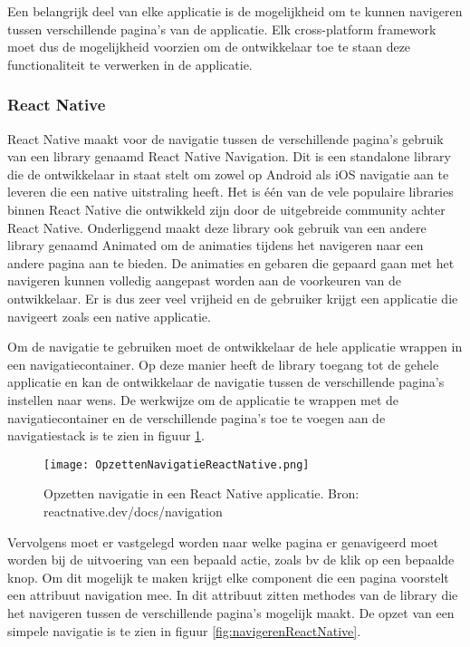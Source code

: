 Een belangrijk deel van elke applicatie is de mogelijkheid om te kunnen navigeren tussen verschillende pagina's van de applicatie. Elk cross-platform framework moet dus de mogelijkheid voorzien om de ontwikkelaar toe te staan deze functionaliteit te verwerken in de applicatie.

\subsubsection{React Native}
\label{subsubsec:navigatieReactNative}

React Native maakt voor de navigatie tussen de verschillende pagina's gebruik van een library genaamd React Native Navigation. Dit is een standalone library die de ontwikkelaar in staat stelt om zowel op Android als iOS navigatie aan te leveren die een native uitstraling heeft. Het is één van de vele populaire libraries binnen React Native die ontwikkeld zijn door de uitgebreide community achter React Native. Onderliggend maakt deze library ook gebruik van een andere library genaamd Animated om de animaties tijdens het navigeren naar een andere pagina aan te bieden. De animaties en gebaren die gepaard gaan met het navigeren kunnen volledig aangepast worden aan de voorkeuren van de ontwikkelaar. Er is dus zeer veel vrijheid en de gebruiker krijgt een applicatie die navigeert zoals een native applicatie. 

Om de navigatie te gebruiken moet de ontwikkelaar de hele applicatie wrappen in een navigatiecontainer. Op deze manier heeft de library toegang tot de gehele applicatie en kan de ontwikkelaar de navigatie tussen de verschillende pagina's instellen naar wens. De werkwijze om de applicatie te wrappen met de navigatiecontainer en de verschillende pagina's toe te voegen aan de navigatiestack is te zien in figuur \ref{fig:opzettenNavigatieReactNative}.

\begin{figure}
    \texttt{[image: OpzettenNavigatieReactNative.png]}
    \caption{Opzetten navigatie in een React Native applicatie. Bron: reactnative.dev/docs/navigation}
    \label{fig:opzettenNavigatieReactNative}
\end{figure}

Vervolgens moet er vastgelegd worden naar welke pagina er genavigeerd moet worden bij de uitvoering van een bepaald actie, zoals bv de klik op een bepaalde knop. Om dit mogelijk te maken krijgt elke component die een pagina voorstelt een attribuut navigation mee. In dit attribuut zitten methodes van de library die het navigeren tussen de verschillende pagina's mogelijk maakt. De opzet van een simpele navigatie is te zien in figuur \ref{fig:navigerenReactNative}. 

